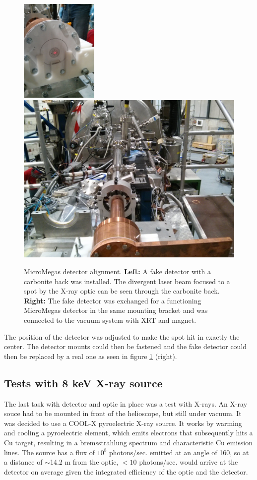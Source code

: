 \begin{figure}[htbp]
  \centering
    \includegraphics[height=5cm]{figures/cast/castxrt_alignment1.jpg}
    \hspace{20pt}
    \includegraphics[width=0.45\linewidth]{figures/cast/castxrt_alignment2.jpg}
  \caption{\footnotesize MicroMegas detector alignment. \textbf{Left:} A fake detector with a carbonite back was installed. The divergent laser beam focused to a spot by the X-ray optic can be seen through the carbonite back. \textbf{Right:} The fake detector was exchanged for a functioning MicroMegas detector in the same mounting bracket and was connected to the vacuum system with XRT and magnet.}
  \label{fig:cast_align}
\end{figure}

The position of the detector was adjusted to make the spot hit in exactly the center. The detector mounts could then be fastened and the fake detector could then be replaced by a real one as seen in figure \ref{fig:cast_align} (right).

\subsection{Tests with 8 keV X-ray source}
The last task with detector and optic in place was a test with X-rays. An X-ray souce had to be mounted in front of the helioscope, but still under vacuum. It was decided to use a COOL-X pyroelectric X-ray source. It works by warming and cooling a pyroelectric element, which emits electrons that subsequently hits a Cu target, resulting in a bremsstrahlung spectrum and characteristic Cu emission lines. The source has a flux of $10^8$ photons/sec. emitted at an angle of 160\degr, so at a distance of $\sim$14.2 m from the optic, $<10$ photons/sec. would arrive at the detector on average given the integrated efficiency of the optic and the detector.

